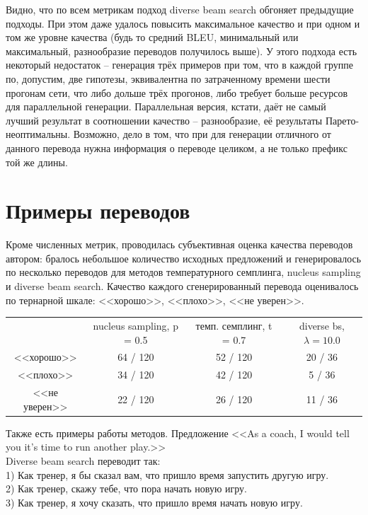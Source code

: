 \documentclass[a4paper, 12pt]{extarticle}
\begin{document}
Видно, что по всем метрикам подход diverse beam search обгоняет предыдущие подходы. При этом даже удалось повысить максимальное качество и при одном и том же уровне качества (будь то средний BLEU, минимальный или максимальный, разнообразие переводов получилось выше). У этого подхода есть некоторый недостаток -- генерация трёх примеров при том, что в каждой группе по, допустим, две гипотезы, эквивалентна по затраченному времени шести прогонам сети, что либо дольше трёх прогонов, либо требует больше ресурсов для параллельной генерации. Параллельная версия, кстати, даёт не самый лучший результат в соотношении качество -- разнообразие, её результаты Парето-неоптимальны. Возможно, дело в том, что при для генерации отличного от данного перевода нужна информация о переводе целиком, а не только префикс той же длины.

\section{Примеры переводов}
    Кроме численных метрик, проводилась субъективная оценка качества переводов автором: бралось небольшое количество исходных предложений и генерировалось по несколько переводов для методов температурного семплинга, nucleus sampling и diverse beam search. Качество каждого сгенерированный перевода оценивалось по тернарной шкале: <<хорошо>>, <<плохо>>, <<не уверен>>.

\begin{center}
    \begin{tabular}{c|c|c|c|}
        \cline{2-4}
        & nucleus sampling, p = 0.5 & темп. семплинг, t = 0.7 & diverse bs, $\lambda = 10.0$ \\ \cline{1-4}
        \multicolumn{1}{|c|}{<<хорошо>>} & 64 / 120 & 52 / 120 & 20 / 36 \\ \cline{1-4}
        \multicolumn{1}{|c|}{<<плохо>>} & 34 / 120 & 42 / 120 & 5 / 36 \\ \cline{1-4}
        \multicolumn{1}{|c|}{<<не уверен>>} & 22 / 120 & 26 / 120 & 11 / 36 \\ \cline{1-4}
    \end{tabular}
\end{center}

Также есть примеры работы методов. Предложение <<As a coach, I would tell you it's time to run another play.>>\\

Diverse beam search переводит так: \\
1) Как тренер, я бы сказал вам, что пришло время запустить другую игру.\\
2) Как тренер, скажу тебе, что пора начать новую игру.\\
3) Как тренер, я хочу сказать, что пришло время начать новую игру.\\
\end{document}
